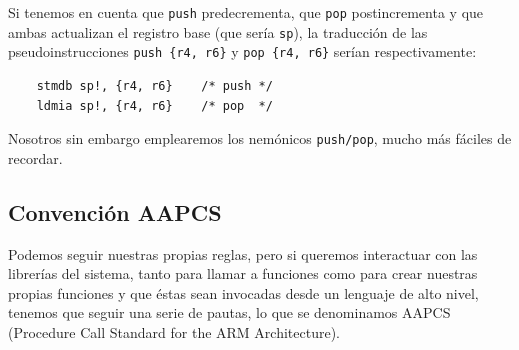 Si tenemos en cuenta que {\tt push} predecrementa, que {\tt pop} postincrementa y que ambas
actualizan el registro base (que sería {\tt sp}), la traducción de las pseudoinstrucciones
{\tt push \{r4, r6\}} y {\tt pop \{r4, r6\}} serían respectivamente:

\begin{lstlisting}
    stmdb sp!, {r4, r6}    /* push */
    ldmia sp!, {r4, r6}    /* pop  */
\end{lstlisting}

Nosotros sin embargo emplearemos los nemónicos {\tt push/pop}, mucho más fáciles de
recordar.

\subsection{Convención AAPCS}

Podemos seguir nuestras propias reglas, pero si queremos interactuar con las librerías
del sistema, tanto para llamar a funciones como para crear nuestras propias funciones
y que éstas sean invocadas desde un lenguaje de alto nivel, tenemos que seguir una serie
de pautas, lo que se denominamos AAPCS (Procedure Call Standard for the ARM Architecture).

